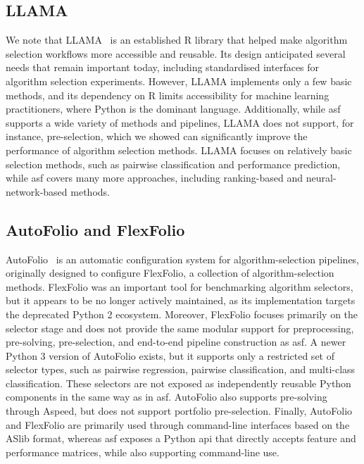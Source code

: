 \subsection{LLAMA}
\label{sec:ch10:llama}
We note that LLAMA~\citep{Kotthoff13} is an established R library that helped make algorithm selection workflows more accessible and reusable. Its design anticipated several needs that remain important today, including standardised interfaces for algorithm selection experiments. However, LLAMA implements only a few basic methods, and its dependency on R limits accessibility for machine learning practitioners, where Python is the dominant language.
Additionally, while \gls{asf} supports a wide variety of methods and pipelines, LLAMA does not support, for instance, pre-selection, which we showed can significantly improve the performance of algorithm selection methods. LLAMA focuses on relatively basic selection methods, such as pairwise classification and performance prediction, while \gls{asf} covers many more approaches, including ranking-based and neural-network-based methods.

\subsection{AutoFolio and FlexFolio}
AutoFolio~\citep{LinEtAl15} is an automatic configuration system for algorithm-selection pipelines, originally designed to configure FlexFolio, a collection of algorithm-selection methods. FlexFolio was an important tool for benchmarking algorithm selectors, but it appears to be no longer actively maintained, as its implementation targets the deprecated Python 2 ecosystem. Moreover, FlexFolio focuses primarily on the selector stage and does not provide the same modular support for preprocessing, pre-solving, pre-selection, and end-to-end pipeline construction as \gls{asf}.
A newer Python 3 version of AutoFolio exists, but it supports only a restricted set of selector types, such as pairwise regression, pairwise classification, and multi-class classification. These selectors are not exposed as independently reusable Python components in the same way as in \gls{asf}. AutoFolio also supports pre-solving through Aspeed, but does not support portfolio pre-selection. Finally, AutoFolio and FlexFolio are primarily used through command-line interfaces based on the ASlib format, whereas \gls{asf} exposes a Python \gls{api} that directly accepts feature and performance matrices, while also supporting command-line use.
